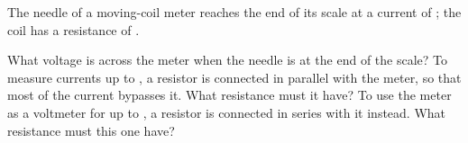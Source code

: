 The needle of a moving-coil meter reaches the end of its scale at a current of \IcO; the coil has a resistance of \RmO.

\begin{abcliste}
\abc What voltage is across the meter when the needle is at the end of the scale?
\abc To measure currents up to \IaO, a resistor is connected in parallel with the meter, so that most of the current bypasses it. What resistance must it have?
\abc To use the meter as a voltmeter for up to \VmaxO, a resistor is connected in series with it instead. What resistance must this one have?
\end{abcliste}
